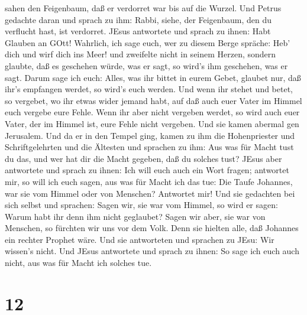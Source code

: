 sahen den Feigenbaum, daß er verdorret war bis auf die Wurzel.
 Und Petrus gedachte daran und sprach zu ihm: Rabbi, siehe,
der Feigenbaum, den du verflucht hast, ist verdorret. 
JEsus antwortete und sprach zu ihnen: Habt Glauben an GOtt!
 Wahrlich, ich sage euch, wer zu diesem Berge spräche: Heb'
dich und wirf dich ins Meer! und zweifelte nicht in seinem Herzen,
sondern glaubte, daß es geschehen würde, was er sagt, so wird's ihm
geschehen, was er sagt.  Darum sage ich euch: Alles, was
ihr bittet in eurem Gebet, glaubet nur, daß ihr's empfangen werdet, so
wird's euch werden.  Und wenn ihr stehet und betet, so
vergebet, wo ihr etwas wider jemand habt, auf daß auch euer Vater im
Himmel euch vergebe eure Fehle.  Wenn ihr aber nicht
vergeben werdet, so wird auch euer Vater, der im Himmel ist, eure Fehle
nicht vergeben.  Und sie kamen abermal gen Jerusalem. Und
da er in den Tempel ging, kamen zu ihm die Hohenpriester und
Schriftgelehrten und die Ältesten  und sprachen zu ihm: Aus
was für Macht tust du das, und wer hat dir die Macht gegeben, daß du
solches tust?  JEsus aber antwortete und sprach zu ihnen:
Ich will euch auch ein Wort fragen; antwortet mir, so will ich euch
sagen, aus was für Macht ich das tue:  Die Taufe Johannes,
war sie vom Himmel oder von Menschen? Antwortet mir!  Und
sie gedachten bei sich selbst und sprachen: Sagen wir, sie war vom
Himmel, so wird er sagen: Warum habt ihr denn ihm nicht geglaubet?
 Sagen wir aber, sie war von Menschen, so fürchten wir uns
vor dem Volk. Denn sie hielten alle, daß Johannes ein rechter Prophet
wäre.  Und sie antworteten und sprachen zu JEsu: Wir
wissen's nicht. Und JEsus antwortete und sprach zu ihnen: So sage ich
euch auch nicht, aus was für Macht ich solches tue.

\hypertarget{section-11}{%
\section{12}\label{section-11}}

